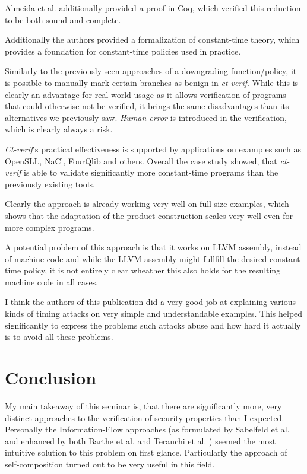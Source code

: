 \documentclass[a4paper,UKenglish]{lipics-v2018}
\begin{document}
Almeida et al. additionally provided a proof in Coq, which verified this reduction to be both sound and complete.\cite{verifying_constant_time_implementations}

Additionally the authors provided a formalization of constant-time theory, which provides a foundation for constant-time policies used in practice.

Similarly to the previously seen approaches of a downgrading function/policy, it is possible to manually mark certain branches as benign in \textit{ct-verif}. While this is clearly an advantage for real-world usage as it allows verification of programs that could otherwise not be verified, it brings the same disadvantages than its alternatives we previously saw. \textit{Human error} is introduced in the verification, which is clearly always a risk.

\textit{Ct-verif}'s practical effectiveness is supported by applications on examples such as OpenSLL, NaCl, FourQlib and others. Overall the case study showed, that \textit{ct-verif} is able to validate significantly more constant-time programs than the previously existing tools.
\cite{verifying_constant_time_implementations}

Clearly the approach is already working very well on full-size examples, which shows that the adaptation of the product construction scales very well even for more complex programs.
\cite{verifying_constant_time_implementations}

A potential problem of this approach is that it works on LLVM assembly, instead of machine code and while the LLVM assembly might fullfill the desired constant time policy, it is not entirely clear wheather this also holds for the resulting machine code in all cases.\cite{verifying_constant_time_implementations}

I think the authors of this publication did a very good job at explaining various kinds of timing attacks on very simple and understandable examples. This helped significantly to express the problems such attacks abuse and how hard it actually is to avoid all these problems.



\section{Conclusion}

My main takeaway of this seminar is, that there are significantly more, very distinct approaches to the verification of security properties than I expected. Personally the Information-Flow approaches (as formulated by Sabelfeld et al.\cite{language_based_information_flow_security} and enhanced by both Barthe et al.\cite{information_flow_by_self_composition} and Terauchi et al. \cite{secure_information_flow_safety}) seemed the most intuitive solution to this problem on first glance. Particularly the approach of self-composition turned out to be very useful in this field.
\end{document}
